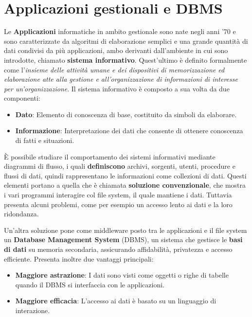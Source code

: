 \section{Applicazioni gestionali e DBMS}
Le \textbf{Applicazioni} informatiche in ambito gestionale sono nate negli anni '70 e sono caratterizzate da algoritmi di elaborazione semplici e una
grande quantità di dati condivisi da più applicazioni, ambo derivanti dall'ambiente in cui sono introdotte, chiamato \textbf{sistema informativo}.
Quest'ultimo è definito formalmente come l'\textit{insieme delle attività umane e dei dispositivi di memorizzazione ed elaborazione atte alla gestione e
all'organizzazione di informazioni di interesse per un'organizzazione}. Il sistema informativo è composto a sua volta da due componenti: \begin{itemize}
    \item \textbf{Dato}:  Elemento di conoscenza di base, costituito da simboli da elaborare.
    \item \textbf{Informazione}: Interpretazione dei dati che consente di ottenere conoscenza di fatti e situazioni.
\end{itemize}

\noindent È possibile studiare il comportamento dei sistemi informativi mediante diagrammi di flusso, i quali \textbf{definiscono} archivi, sorgenti,
utenti, procedure e flussi di dati, quindi rappresentano le informazioni come collezioni di dati. Questi elementi portano a quella che è chiamata
\textbf{soluzione convenzionale}, che mostra i vari programmi interagire col file system, il quale mantiene i dati. Tuttavia presenta alcuni problemi,
come per esempio un accesso lento ai dati e la loro ridondanza.\par
Un'altra soluzione pone come middleware posto tra le applicazioni e il file system un \textbf{Database Management System} (DBMS), un sistema che
gestisce le \textbf{basi di dati} su memoria secondaria, assicurando affidabilità, privatezza e accesso efficiente. Presenta inoltre due vantaggi
principali: \begin{itemize}
    \item \textbf{Maggiore astrazione}: I dati sono visti come oggetti o righe di tabelle quando il DBMS si interfaccia con le applicazioni.
    \item \textbf{Maggiore efficacia}: L'accesso ai dati è basato su un linguaggio di interazione.
\end{itemize}

